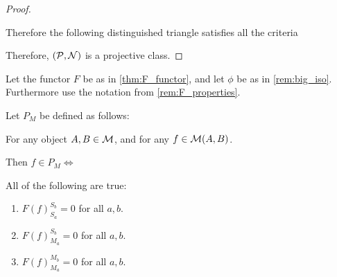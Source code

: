 \begin{proof}
\begin{enumerate}
{            Therefore the following distinguished triangle satisfies all the criteria
            \begin{center}
            \end{center}
        }
    \end{enumerate}
    Therefore, \( ({\mathcal{P}}, {\mathcal{N}}) \) is a projective class.
\end{proof}

\begin{definition} \label{def:P_M}
    Let the functor \( F \) be as in \autoref{thm:F_functor}, and let \( \phi \) be as in \autoref{rem:big_iso}. Furthermore use the notation from \autoref{rem:F_properties}.

    Let \( P_M \) be defined as follows:

    For any object \( A, B \in {\mathcal{M}} \), and for any \( f \in {\mathcal{M}}(A, B) \).

    Then \( f \in P_M  \iff \)

    All of the following are true:
    \begin{enumerate}
        \item \( F(f)_{S_a}^{S_b} = 0 \) for all \( a, b \).
        \item \( F(f)_{M_a}^{S_b} = 0 \) for all \( a, b \).
        \item \( F(f)_{M_a}^{M_b} = 0 \) for all \( a, b \).
    \end{enumerate}
\end{definition}

